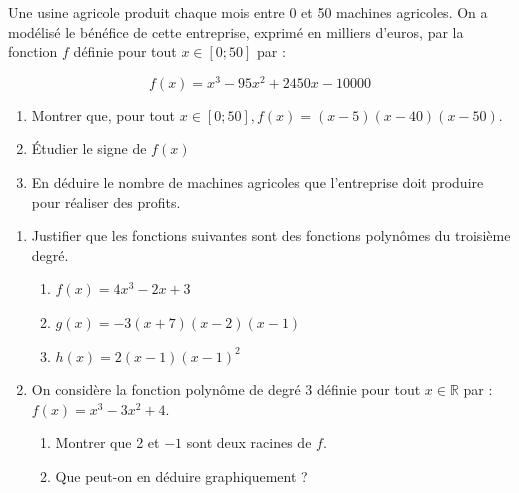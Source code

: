 \documentclass[french]{book}
\begin{document}
\begin{exocor}
Une usine agricole produit chaque mois entre 0 et 50 machines agricoles. On a modélisé le bénéfice de cette entreprise, exprimé en milliers d'euros, par la fonction $f$ définie pour tout $x \in[0 ; 50]$ par :

$$
f(x)=x^{3}-95 x^{2}+2450 x-10000
$$

\begin{enumerate}
\item Montrer que, pour tout $x \in[0 ; 50], f(x)=(x-5)(x-40)(x-50)$.
\item Étudier le signe de $f(x)$
\item En déduire le nombre de machines agricoles que l'entreprise doit produire pour réaliser des profits. 
\end{enumerate}

\end{exocor}


\begin{exocor}

\begin{enumerate}
\item Justifier que les fonctions suivantes sont des fonctions polynômes du troisième degré.

\begin{enumerate}
\item $f(x)=4 x^{3}-2 x+3$
\item $g(x)=-3(x+7)(x-2)(x-1)$
\item $h(x)=2(x-1)(x-1)^{2}$
\end{enumerate}

\item On considère la fonction polynôme de degré 3 définie pour tout $x \in \mathbb{R}$ par : $f(x)=x^{3}-3 x^{2}+4$.

\begin{enumerate}
\item Montrer que 2 et $-1$ sont deux racines de $f$.
\item Que peut-on en déduire graphiquement ?
\end{enumerate}

\end{enumerate}

\end{exocor}
\end{document}
